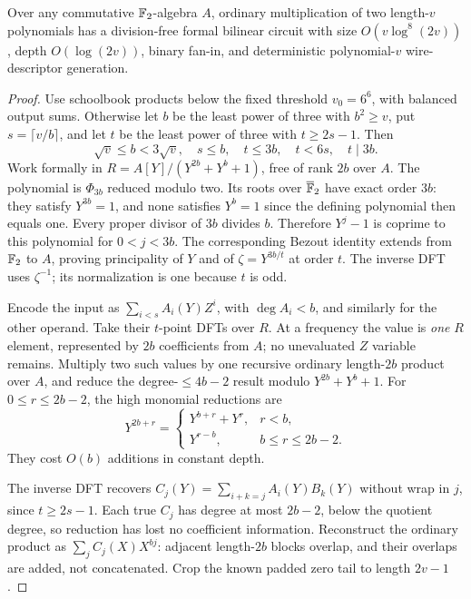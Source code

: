\begin{lemma}
\label{lem:formal-convolution}
Over any commutative $\mathbb F_2$-algebra $A$, ordinary multiplication of
two length-$v$ polynomials has a division-free formal bilinear circuit
with size $O(v\log^8(2v))$, depth $O(\log(2v))$, binary fan-in,
and deterministic polynomial-$v$ wire-descriptor generation.
\end{lemma}
\begin{proof}
Use schoolbook products below the fixed threshold $v_0=6^6$, with
balanced output sums. Otherwise let $b$ be the least power of three
with $b^2\ge v$, put $s=\lceil v/b\rceil$, and let $t$ be the
least power of three with $t\ge2s-1$. Then
\[
 \sqrt v\le b<3\sqrt v,\quad s\le b,\quad
 t\le3b,\quad t<6s,\quad t\mid3b.
\]
Work formally in $R=A[Y]/(Y^{2b}+Y^b+1)$, free of rank $2b$
over $A$. The polynomial is $\Phi_{3b}$ reduced modulo two.
Its roots over $\overline{\mathbb F}_2$ have exact order $3b$: they
satisfy $Y^{3b}=1$, and none satisfies $Y^b=1$ since the defining
polynomial then equals one. Every proper divisor of $3b$ divides
$b$. Therefore $Y^j-1$ is coprime to this polynomial for
$0<j<3b$. The corresponding Bezout identity extends from $\mathbb F_2$
to $A$, proving principality of $Y$ and of
$\zeta=Y^{3b/t}$ at order $t$. The inverse DFT uses $\zeta^{-1}$;
its normalization is one because $t$ is odd.

Encode the input as $\sum_{i<s}A_i(Y)Z^i$, with
$\deg A_i<b$, and similarly for the other operand. Take their
$t$-point DFTs over $R$. At a frequency the value is \emph{one}
$R$ element, represented by $2b$ coefficients from $A$; no
unevaluated $Z$ variable remains. Multiply two such values by one
recursive ordinary length-$2b$ product over $A$, and reduce the
degree-$\le4b-2$ result modulo $Y^{2b}+Y^b+1$.
For $0\le r\le2b-2$, the high monomial reductions are
\[
 Y^{2b+r}=
 \begin{cases}
   Y^{b+r}+Y^r,&r<b,\\
   Y^{r-b},&b\le r\le2b-2.
 \end{cases}
\]
They cost $O(b)$ additions in constant depth.

The inverse DFT recovers
$C_j(Y)=\sum_{i+k=j}A_i(Y)B_k(Y)$ without wrap in $j$, since
$t\ge2s-1$. Each true $C_j$ has degree at most $2b-2$, below the
quotient degree, so reduction has lost no coefficient information.
Reconstruct the ordinary product as $\sum_j C_j(X)X^{bj}$:
adjacent length-$2b$ blocks overlap, and their overlaps are added,
not concatenated. Crop the known padded zero tail to length $2v-1$.


\end{proof}
